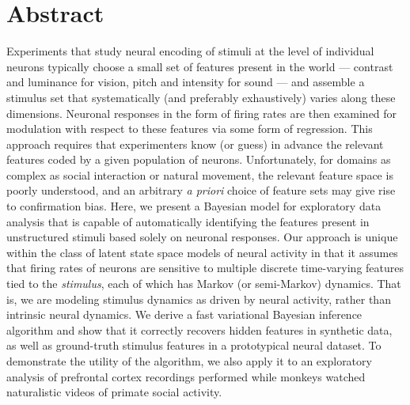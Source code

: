 \documentclass[10pt,letterpaper]{article}
\begin{document}
\section*{Abstract}
Experiments that study neural encoding of stimuli at the level of individual neurons typically choose a small set of features present in the world --- contrast and luminance for vision, pitch and intensity for sound --- and assemble a stimulus set that systematically (and preferably exhaustively) varies along these dimensions. Neuronal responses in the form of firing rates are then examined for modulation with respect to these features via some form of regression. This approach requires that experimenters know (or guess) in advance the relevant features coded by a given population of neurons. Unfortunately, for domains as complex as social interaction or natural movement, the relevant feature space is poorly understood, and an arbitrary \emph{a priori} choice of feature sets may give rise to confirmation bias. Here, we present a Bayesian model for exploratory data analysis that is capable of automatically identifying the features present in unstructured stimuli based solely on neuronal responses. Our approach is unique within the class of latent state space models of neural activity in that it assumes that firing rates of neurons are sensitive to multiple discrete time-varying features tied to the \emph{stimulus}, each of which has Markov (or semi-Markov) dynamics. That is, we are modeling stimulus dynamics as driven by neural activity, rather than intrinsic neural dynamics.  We derive a fast variational Bayesian inference algorithm and show that it correctly recovers hidden features in synthetic data, as well as ground-truth stimulus features in a prototypical neural dataset. To demonstrate the utility of the algorithm, we also apply it to an exploratory analysis of prefrontal cortex recordings performed while monkeys watched naturalistic videos of primate social activity.

\end{document}
